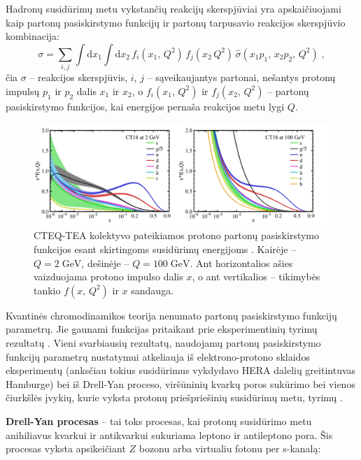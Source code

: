 \documentclass[a4paper, 12pt, oneside]{article}
\newlength\q
\begin{document}
Hadronų susidūrimų metu vykstančių reakcijų skerspjūviai yra apskaičiuojami kaip partonų pasiskirstymo
funkcijų ir partonų tarpusavio reakcijos skerspjūvio kombinacija:
\begin{equation}
	\sigma = \sum_{i, j} \int \mathrm{d}x_1 \int \mathrm{d}x_2 \,
	f_{i}(x_1, \, Q^2) \, f_{j}(x_2 \, Q^2) \, \hat{\sigma}(x_1 p_1, \, x_2 p_2, \, Q^2) \; \mathrm{,}
	\label{eq:PDFxsec}
\end{equation}
čia $\sigma$ -- reakcijos skerspjūvis, $i$, $j$ -- sąveikaujantys partonai, nešantys protonų impulsų $p_1$ ir $p_2$
dalis $x_1$ ir $x_2$, o $f_{i}(x_1, \, Q^2)$ ir $f_{j}(x_2, \, Q^2)$ -- partonų pasiskirstymo funkcijos, kai
energijos pernaša reakcijos metu lygi $Q$.

\begin{figure}[t]
	\includegraphics[width=\linewidth]{CT18_PDF.png}
	\caption{\label{fig:PDFs}
		CTEQ-TEA kolektyvo pateikiamos protono partonų pasiskirstymo funkcijos esant skirtingoms susidūrimų energijoms \cite{CTEQ2019}.
		Kairėje -- $Q=2 \; \mathrm{GeV}$, dešinėje -- $Q=100 \; \mathrm{GeV}$.
		Ant horizontalios ašies vaizduojama protono impulso dalis $x$, o ant vertikalios -- tikimybės tankio $f(x,\, Q^2)$
		ir $x$ sandauga.}
\end{figure}


Kvantinės chromodinamikos teorija nenumato partonų pasiskirstymo funkcijų parametrų.
Jie gaunami funkcijas pritaikant prie eksperimentinių tyrimų rezultatų \cite{NNPDF, PDF_ABMP16, CTEQ2019}.
Vieni svarbiausių rezultatų, naudojamų partonų pasiskirstymo funkcijų parametrų nustatymui atkeliauja iš elektrono-protono
sklaidos eksperimentų (anksčiau tokius susidūrimus vykdydavo HERA dalelių greitintuvas Hamburge) bei iš
Drell-Yan proceso, viršūninių kvarkų poros sukūrimo bei vienos čiurkšlės įvykių, kurie vyksta protonų priešpriešinių susidūrimų
metu, tyrimų \cite{CTEQ2019}.

\textbf{Drell-Yan procesas} \cite{DYoriginal} -- tai toks procesas, kai protonų susidūrimo metu anihiliavus kvarkui ir antikvarkui
sukuriama leptono ir antileptono pora.
Šis procesas vyksta apsikeičiant $Z$ bozonu arba virtualiu fotonu per s-kanalą:
\end{document}
